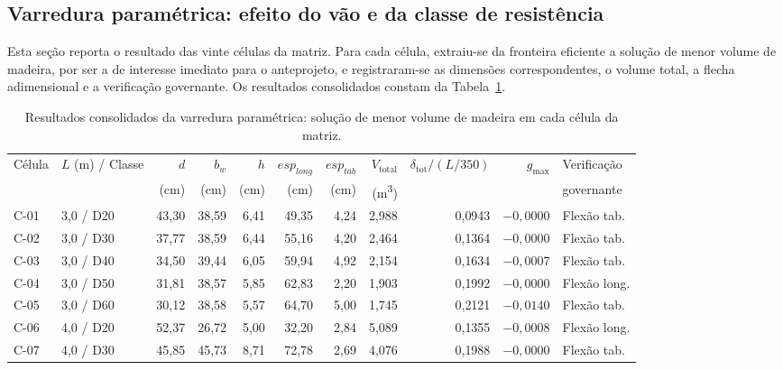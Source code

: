 \subsection{Varredura paramétrica: efeito do vão e da classe de resistência}\label{sec:varredura}

Esta seção reporta o resultado das vinte células da matriz.
Para cada célula, extraiu-se da fronteira eficiente a solução de menor volume de madeira, por ser a de interesse imediato para o anteprojeto, e registraram-se as dimensões correspondentes, o volume total, a flecha adimensional e a verificação governante.
Os resultados consolidados constam da Tabela~\ref{tab:resultados_matriz}.

\begin{table}[!ht]
\caption{Resultados consolidados da varredura paramétrica: solução de menor volume de madeira em cada célula da matriz.\label{tab:resultados_matriz}}
\begin{threeparttable}
\footnotesize
\setlength{\tabcolsep}{3pt}
\begin{tabular*}{\textwidth}{@{\extracolsep{\fill}}llrrrrrrrrl@{\extracolsep{\fill}}}
\toprule
Célula & $L$ (m) / Classe & $d$ & $b_w$ & $h$ & $esp_{long}$ & $esp_{tab}$ & $V_{\mathrm{total}}$ & $\delta_{\mathrm{tot}}/(L/350)$ & $g_{\max}$ & Verificação \\
 & & (cm) & (cm) & (cm) & (cm) & (cm) & (m\textsuperscript{3}) & & & governante \\
\midrule
C-01 & 3{,}0 / D20 & 43{,}30 & 38{,}59 & 6{,}41 & 49{,}35 & 4{,}24 & 2{,}988 & 0{,}0943 & $-0{,}0000$ & Flexão tab. \\
C-02 & 3{,}0 / D30 & 37{,}77 & 38{,}59 & 6{,}44 & 55{,}16 & 4{,}20 & 2{,}464 & 0{,}1364 & $-0{,}0000$ & Flexão tab. \\
C-03 & 3{,}0 / D40 & 34{,}50 & 39{,}44 & 6{,}05 & 59{,}94 & 4{,}92 & 2{,}154 & 0{,}1634 & $-0{,}0007$ & Flexão tab. \\
C-04 & 3{,}0 / D50 & 31{,}81 & 38{,}57 & 5{,}85 & 62{,}83 & 2{,}20 & 1{,}903 & 0{,}1992 & $-0{,}0000$ & Flexão long. \\
C-05 & 3{,}0 / D60 & 30{,}12 & 38{,}58 & 5{,}57 & 64{,}70 & 5{,}00 & 1{,}745 & 0{,}2121 & $-0{,}0140$ & Flexão tab. \\
\midrule
C-06 & 4{,}0 / D20 & 52{,}37 & 26{,}72 & 5{,}00 & 32{,}20 & 2{,}84 & 5{,}089 & 0{,}1355 & $-0{,}0008$ & Flexão long. \\
C-07 & 4{,}0 / D30 & 45{,}85 & 45{,}73 & 8{,}71 & 72{,}78 & 2{,}69 & 4{,}076 & 0{,}1988 & $-0{,}0000$ & Flexão tab. \\

\end{tabular*}
\end{threeparttable}
\end{table}

